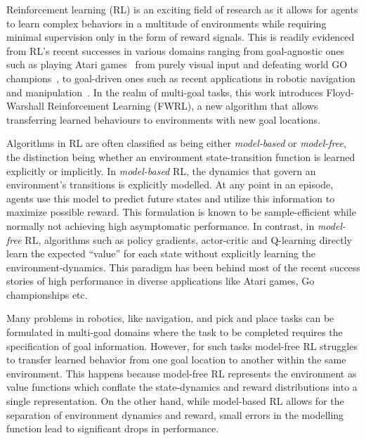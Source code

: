 Reinforcement learning (RL) is an exciting field of research as it allows for
agents to learn complex behaviors in a multitude of environments while requiring
minimal supervision only in the form of reward signals. This is readily
evidenced from RL's recent successes in various domains ranging from goal-agnostic ones such as  
playing Atari games~\cite{MnKaSiNATURE2015} from purely visual input and defeating world GO
champions~\cite{gibney2016google}, to goal-driven ones such as recent
applications in robotic navigation~\cite{mirowski2018learning} and
manipulation~\cite{pong2018temporal}. In the realm of multi-goal tasks, this
work introduces Floyd-Warshall Reinforcement Learning (FWRL), a new algorithm
that allows transferring learned behaviours to environments with new goal
locations.

Algorithms in RL are often classified as being either
\emph{model-based} or \emph{model-free}, the distinction being whether
an environment state-transition function is learned explicitly or
implicitly.  In \emph{model-based} RL, the dynamics that govern an
environment's transitions is explicitly modelled.
At any point in an episode, agents use this model to
predict future states and utilize this information to maximize possible
reward. This formulation is known to be sample-efficient while normally
not achieving high asymptomatic performance.
In contrast, in \emph{model-free} RL, algorithms such as policy gradients,
actor-critic and Q-learning directly learn the expected ``value'' for each
state without explicitly learning the environment-dynamics. This paradigm has
been behind most of the recent success stories of high performance in diverse
applications like Atari games, Go championships etc.

Many problems in robotics, like navigation, and  pick and place tasks can be
formulated in multi-goal domains where the task to be completed requires the
specification of goal information. However, for such tasks model-free RL struggles
to transfer learned behavior from one goal location to another within the same
environment. This happens because model-free RL represents the environment as
value functions which conflate the state-dynamics and reward distributions into
a single representation.
On the other hand, while model-based RL allows for the separation of environment
dynamics and reward, small errors in the modelling function lead to significant
drops in performance.

